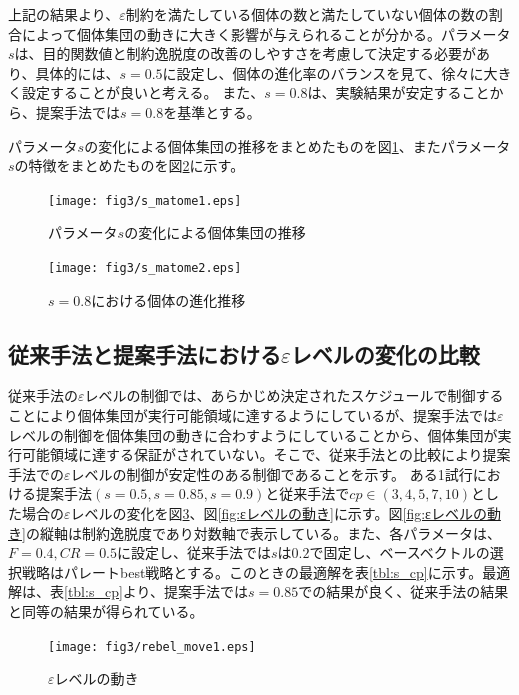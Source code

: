 \documentclass[a4paper,12pt]{jsreport}
\begin{document}
上記の結果より、$\varepsilon$制約を満たしている個体の数と満たしていない個体の数の割合によって個体集団の動きに大きく影響が与えられることが分かる。パラメータ$s$は、目的関数値と制約逸脱度の改善のしやすさを考慮して決定する必要があり、具体的には、$s=0.5$に設定し、個体の進化率のバランスを見て、徐々に大きく設定することが良いと考える。
また、$s=0.8$は、実験結果が安定することから、提案手法では$s=0.8$を基準とする。

パラメータ$s$の変化による個体集団の推移をまとめたものを図\ref{fig:s_matome1}、またパラメータ$s$の特徴をまとめたものを図\ref{fig:s_matome2}に示す。

\begin{figure}[htbp]
  \centering
  \texttt{[image: fig3/s\_matome1.eps]}
  \caption{パラメータ$s$の変化による個体集団の推移}
  \label{fig:s_matome1}
\end{figure}

\begin{figure}[htbp]
  \centering
  \texttt{[image: fig3/s\_matome2.eps]}
  \caption{$s=0.8$における個体の進化推移}
  \label{fig:s_matome2}
\end{figure}

\newpage

\subsection{従来手法と提案手法における$\varepsilon$レベルの変化の比較}
従来手法の$\varepsilon$レベルの制御では、あらかじめ決定されたスケジュールで制御することにより個体集団が実行可能領域に達するようにしているが、提案手法では$\varepsilon$レベルの制御を個体集団の動きに合わすようにしていることから、個体集団が実行可能領域に達する保証がされていない。そこで、従来手法との比較により提案手法での$\varepsilon$レベルの制御が安定性のある制御であることを示す。
ある1試行における提案手法$(s=0.5,s=0.85,s=0.9)$と従来手法で$cp \in       (3,4,5,7,10)$とした場合の$\varepsilon$レベルの変化を図\ref{fig:εレベルの動き1}、図\ref{fig:εレベルの動き}に示す。図\ref{fig:εレベルの動き}の縦軸は制約逸脱度であり対数軸で表示している。また、各パラメータは、$F=0.4,CR=0.5$に設定し、従来手法では$s$は$0.2$で固定し、ベースベクトルの選択戦略はパレートbest戦略とする。このときの最適解を表\ref{tbl:s_cp}に示す。最適解は、表\ref{tbl:s_cp}より、提案手法では$s=0.85$での結果が良く、従来手法の結果と同等の結果が得られている。

\begin{figure}[htbp]
  \centering
  \texttt{[image: fig3/rebel\_move1.eps]}
  \caption{$\varepsilon$レベルの動き}
  \label{fig:εレベルの動き1}
\end{figure}
\end{document}
